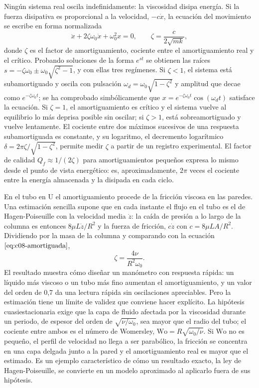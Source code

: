 \documentclass[10pt,openany]{book}
\begin{document}
Ningún sistema real oscila indefinidamente: la viscosidad disipa energía. Si la fuerza disipativa es proporcional a la velocidad, \(-c\dot x\), la ecuación del movimiento se escribe en forma normalizada
\begin{equation}
\ddot x + 2\zeta\omega_0\dot x + \omega_0^{2}x = 0, \qquad \zeta = \frac{c}{2\sqrt{mk}}, \label{eq:c08-amortiguada}
\end{equation}
donde \(\zeta\) es el factor de amortiguamiento, cociente entre el amortiguamiento real y el crítico. Probando soluciones de la forma \(e^{st}\) se obtienen las raíces \(s = -\zeta\omega_0 \pm \omega_0\sqrt{\zeta^{2} - 1}\), y con ellas tres regímenes. Si \(\zeta < 1\), el sistema está subamortiguado y oscila con pulsación \(\omega_d = \omega_0\sqrt{1 - \zeta^{2}}\) y amplitud que decae como \(e^{-\zeta\omega_0 t}\); se ha comprobado simbólicamente que \(x = e^{-\zeta\omega_0 t}\cos(\omega_d t)\) satisface la ecuación. Si \(\zeta = 1\), el amortiguamiento es crítico y el sistema vuelve al equilibrio lo más deprisa posible sin oscilar; si \(\zeta > 1\), está sobreamortiguado y vuelve lentamente. El cociente entre dos máximos sucesivos de una respuesta subamortiguada es constante, y su logaritmo, el decremento logarítmico \(\delta = 2\pi\zeta/\sqrt{1 - \zeta^{2}}\), permite medir \(\zeta\) a partir de un registro experimental. El factor de calidad \(Q_f \approx 1/(2\zeta)\) para amortiguamientos pequeños expresa lo mismo desde el punto de vista energético: es, aproximadamente, \(2\pi\) veces el cociente entre la energía almacenada y la disipada en cada ciclo.

En el tubo en U el amortiguamiento procede de la fricción viscosa en las paredes. Una estimación sencilla supone que en cada instante el flujo en el tubo es el de Hagen-Poiseuille con la velocidad media \(\dot z\): la caída de presión a lo largo de la columna es entonces \(8\mu L\dot z/R^{2}\) y la fuerza de fricción, \(c\dot z\) con \(c = 8\mu L A/R^{2}\). Dividiendo por la masa de la columna y comparando con la ecuación \(\eqref{eq:c08-amortiguada}\),
\begin{equation}
\zeta = \frac{4\nu}{R^{2}\omega_0}. \label{eq:c08-amort-tubo}
\end{equation}
El resultado muestra cómo diseñar un manómetro con respuesta rápida: un líquido más viscoso o un tubo más fino aumentan el amortiguamiento, y un valor del orden de 0,7 da una lectura rápida sin oscilaciones apreciables. Pero la estimación tiene un límite de validez que conviene hacer explícito. La hipótesis cuasiestacionaria exige que la capa de fluido afectada por la viscosidad durante un periodo, de espesor del orden de \(\sqrt{\nu/\omega_0}\), sea mayor que el radio del tubo; el cociente entre ambos es el número de Womersley, \(\mathrm{Wo} = R\sqrt{\omega_0/\nu}\). Si \(\mathrm{Wo}\) no es pequeño, el perfil de velocidad no llega a ser parabólico, la fricción se concentra en una capa delgada junto a la pared y el amortiguamiento real es mayor que el estimado. Es un ejemplo característico de cómo un resultado exacto, la ley de Hagen-Poiseuille, se convierte en un modelo aproximado al aplicarlo fuera de sus hipótesis.
\end{document}
